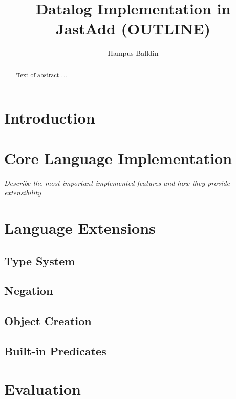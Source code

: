 \documentclass[sigplan,10pt]{acmart}
\begin{document}
\title[Short Title]{Datalog Implementation in JastAdd (OUTLINE)}         %



\author{Hampus Balldin}


\begin{abstract}
Text of abstract \ldots.
\end{abstract}


\maketitle
\section{Introduction}

\section{Core Language Implementation}
\textit{Describe the most important implemented features and how they provide extensibility}
\section{Language Extensions}
\subsection{Type System}
\subsection{Negation}
\subsection{Object Creation}
\subsection{Built-in Predicates}
\section{Evaluation}
\end{document}
